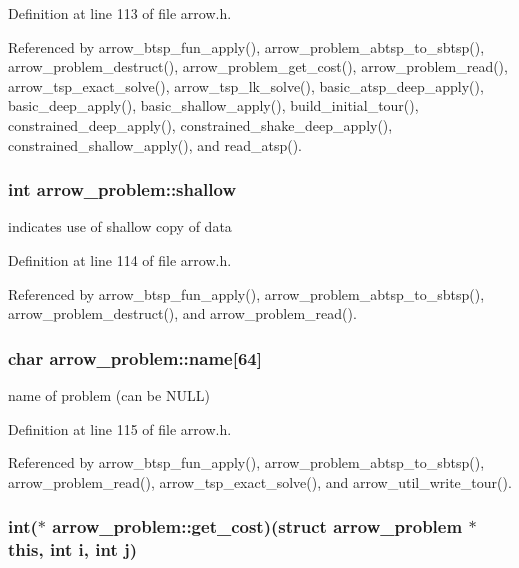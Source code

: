 Definition at line 113 of file arrow.h.

Referenced by arrow\_\-btsp\_\-fun\_\-apply(), arrow\_\-problem\_\-abtsp\_\-to\_\-sbtsp(), arrow\_\-problem\_\-destruct(), arrow\_\-problem\_\-get\_\-cost(), arrow\_\-problem\_\-read(), arrow\_\-tsp\_\-exact\_\-solve(), arrow\_\-tsp\_\-lk\_\-solve(), basic\_\-atsp\_\-deep\_\-apply(), basic\_\-deep\_\-apply(), basic\_\-shallow\_\-apply(), build\_\-initial\_\-tour(), constrained\_\-deep\_\-apply(), constrained\_\-shake\_\-deep\_\-apply(), constrained\_\-shallow\_\-apply(), and read\_\-atsp().\hypertarget{structarrow__problem_8c3f4f7794c1430440658d69151b296d}{
\subsubsection{\setlength{\rightskip}{0pt plus 5cm}int {\bf arrow\_\-problem::shallow}}}
\label{structarrow__problem_8c3f4f7794c1430440658d69151b296d}


indicates use of shallow copy of data 

Definition at line 114 of file arrow.h.

Referenced by arrow\_\-btsp\_\-fun\_\-apply(), arrow\_\-problem\_\-abtsp\_\-to\_\-sbtsp(), arrow\_\-problem\_\-destruct(), and arrow\_\-problem\_\-read().\hypertarget{structarrow__problem_49462b24d5f3de4c973bfcf868d7b606}{
\subsubsection{\setlength{\rightskip}{0pt plus 5cm}char {\bf arrow\_\-problem::name}\mbox{[}64\mbox{]}}}
\label{structarrow__problem_49462b24d5f3de4c973bfcf868d7b606}


name of problem (can be NULL) 

Definition at line 115 of file arrow.h.

Referenced by arrow\_\-btsp\_\-fun\_\-apply(), arrow\_\-problem\_\-abtsp\_\-to\_\-sbtsp(), arrow\_\-problem\_\-read(), arrow\_\-tsp\_\-exact\_\-solve(), and arrow\_\-util\_\-write\_\-tour().\hypertarget{structarrow__problem_4f1f4c9ef90f240b248e8f39360da769}{
\subsubsection{\setlength{\rightskip}{0pt plus 5cm}int($\ast$ {\bf arrow\_\-problem::get\_\-cost})(struct {\bf arrow\_\-problem} $\ast$this, int i, int j)}}
\label{structarrow__problem_4f1f4c9ef90f240b248e8f39360da769}



